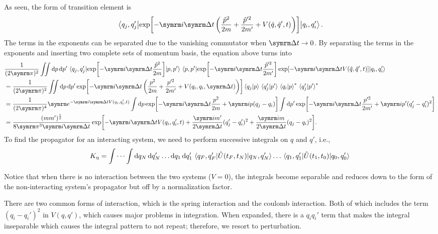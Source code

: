 As seen, the form of transition element is
\begin{equation}
    \mel{q_j, q_j'}{\exp[-\im\Dd{t}\left(\frac{\hat{p}^2}{2m} + \frac{\hat{p}'^2}{2m'} + V(\hat{q}, \hat{q}', t)\right)]}{q_i, q_i'}.
\end{equation}
The terms in the exponents can be separated due to the vanishing commutator when $\Dd{t} \appr 0$. By separating the terms in the exponents and inserting two complete sets of momentum basis, the equation above turns into
\begin{align}
    & \frac{1}{(2\cpi)^2} \iint\dd{p}\dd{p'} \mel*{q_j, q_j'}{\exp[-\im\Dd{t}\frac{\hat{p}^2}{2m}]}{p, p'}\mel{p, p'}{\exp[-\im\Dd{t}\frac{\hat{p}'^2}{2m'}]\exp[-\im\Dd{t}V(\hat{q}, \hat{q}', t)]}{q_i, q_i'} \nonumber\\
    &= \frac{1}{(2\cpi)^2} \iint\dd{p}\dd{p'} \exp[-\im\Dd{t}\left(\frac{p^2}{2m} + \frac{p'^2}{2m'} + V(q_i, q_i, \Dd{t})\right)]\braket*{q_j}{p}\braket*{q_j'}{p'}\braket*{q_i}{p}\conj\braket*{q_j'}{p'}\conj \nonumber\\
    &= \frac{1}{(2\cpi)^4} \e^{-\im\Dd{t}V(q_i, q_i', t)} \int\dd{p}\exp[-\im\Dd{t}\frac{p^2}{2m} + \im p(q_j - q_i)]\int\dd{p'}\exp[-\im\Dd{t}\frac{p'^2}{2m'} + \im p'(q_j' - q_i')^2] \nonumber\\
    &= \frac{(mm')^{\frac{1}{2}}}{8\cpi^3\im\Dd{t}}\exp[-\im\Dd{t}V(q_i, q_i', t) + \frac{\im m'}{2\Dd{t}}(q_j' - q_i')^2 + \frac{\im m}{2\Dd{t}}(q_j - q_i)^2].
\end{align}
To find the propagator for an interacting system, we need to perform successive integrals on $q$ and $q'$, i.e.,
\begin{equation}
    K_{\eta} = \idotsint \dd{q_N}\dd{q_N'}\dots\dd{q_1}\dd{q_1'}\mel{q_F, q_F'}{\hat{U}(t_F, t_N)}{q_N, q_N'}\dots\mel{q_1, q_1'}{\hat{U}(t_1, t_0)}{q_0, q_0'}
\end{equation}

Notice that when there is no interaction between the two systems ($V = 0$), the integrals become separable and reduces down to the form of the non-interacting system's propagator but off by a normalization factor.

There are two common forms of interaction, which is the spring interaction and the coulomb interaction. Both of which includes the term $(q_i - q_i')^2$ in $V(q, q')$, which causes major problems in integration. When expanded, there is a $q_iq_i'$ term that makes the integral inseparable which causes the integral pattern to not repeat; therefore, we resort to perturbation.

